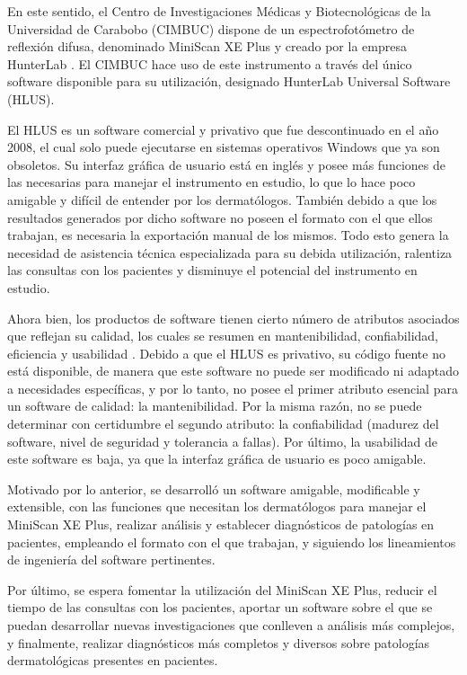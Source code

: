 \documentclass[conference]{IEEEtran}
\begin{document}
En este sentido, el Centro de Investigaciones M\'{e}dicas y Biotecnol\'{o}gicas de la Universidad de Carabobo \mbox{(CIMBUC)} dispone de un espectrofot\'{o}metro de reflexi\'{o}n difusa, denominado MiniScan XE Plus y creado por la empresa HunterLab \cite{HunterLab}. El CIMBUC hace uso de este instrumento a trav\'{e}s del \'{u}nico software disponible para su utilizaci\'{o}n, designado HunterLab Universal Software (HLUS)\cite{HunterLab-manual}.

El HLUS es un software \mbox{comercial} y privativo que fue descontinuado en el a\~{n}o 2008, el cual solo puede ejecutarse en \mbox{sistemas} \mbox{operativos} Windows que ya son obsoletos. Su interfaz gr\'{a}fica de usuario est\'{a} en ingl\'{e}s y posee m\'{a}s funciones de las necesarias para manejar el instrumento en estudio, lo que lo hace poco amigable y dif\'{i}cil de entender por los dermat\'{o}logos. Tambi\'{e}n debido a que los resultados generados por dicho software no poseen el formato con el que ellos trabajan, es necesaria la exportaci\'{o}n manual de los mismos. Todo esto genera la necesidad de asistencia t\'{e}cnica especializada para su debida utilizaci\'{o}n, ralentiza las consultas con los pacientes y disminuye el potencial del instrumento en estudio.

Ahora bien, los productos de software tienen cierto n\'{u}mero de atributos asociados que reflejan su calidad, los cuales se resumen en mantenibilidad, confiabilidad, eficiencia y usabilidad \cite{Sommerville}. Debido a que el HLUS es \mbox{privativo}, su c\'{o}digo fuente no est\'{a} disponible, de manera que este software no puede ser modificado ni adaptado a necesidades espec\'{i}ficas, y por lo tanto, no posee el primer atributo esencial para un software de calidad: la mantenibilidad. Por la misma raz\'{o}n, no se puede determinar con certidumbre el segundo atributo: la confiabilidad (madurez del software, nivel de seguridad y tolerancia a fallas). Por \'{u}ltimo, la usabilidad de este software es baja, ya que la interfaz gr\'{a}fica de usuario es poco amigable.

Motivado por lo anterior, se desarroll\'{o} un software amigable, modificable y extensible, con las funciones que necesitan los dermat\'{o}logos para manejar el MiniScan XE Plus, realizar an\'{a}lisis y establecer \mbox{diagn\'{o}sticos} de patolog\'{i}as en pacientes, empleando el formato con el que trabajan, y siguiendo los lineamientos de ingenier\'{i}a del software pertinentes.

Por \'{u}ltimo, se espera fomentar la utilizaci\'{o}n del MiniScan XE Plus, reducir el tiempo de las consultas con los pacientes, aportar un software sobre el que se puedan desarrollar nuevas investigaciones que conlleven a an\'{a}lisis m\'{a}s complejos, y finalmente, realizar diagn\'{o}sticos m\'{a}s completos y diversos sobre patolog\'{i}as dermatol\'{o}gicas presentes en pacientes.
\end{document}
